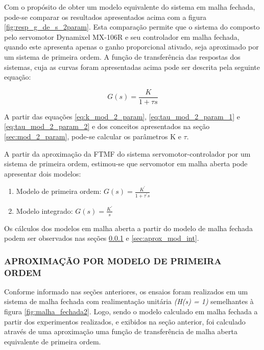 \documentclass[12pt,oneside,a4paper, chapter=TITLE, section = TITLE, english, brazil]{abntex2}
\begin{document}
Com o propósito de obter um modelo equivalente do sistema em malha fechada, pode-se comparar os resultados apresentados acima com a figura \ref{fig:resp_g_de_s_2param}. Esta comparação permite que o sistema do composto pelo servomotor Dynamixel MX-106R e seu controlador em malha fechada, quando este apresenta apenas o ganho proporcional ativado, seja aproximado por um sistema de primeira ordem. A função de transferência das respostas dos sistemas, cuja as curvas foram apresentadas acima pode ser descrita pela seguinte equação:

\begin{equation}
G(s) = \frac{K}{1 + \tau s} \label{eq:g_s_1_ordem_MF}
\end{equation}

A partir das equações \ref{eq:k_mod_2_param}, \ref{eq:tau_mod_2_param_1} e \ref{eq:tau_mod_2_param_2} e dos conceitos apresentados na seção \ref{sec:mod_2_param}, pode-se calcular os parâmetros K e $\tau$.

A partir da aproximação da FTMF do sistema servomotor-controlador por um sistema de primeira ordem, estimou-se que servomotor em malha aberta pode apresentar dois modelos:

\begin{enumerate}

\item Modelo de primeira ordem:
$G(s) = \frac{K^{'}}{1 + \tau^{'} s}$

\item Modelo integrado:
$G(s) = \frac{K^{'}}{s}$

\end{enumerate}

Os cálculos dos modelos em malha aberta a partir do modelo de malha fechada podem ser observados nas seções \ref{sec:aprox_mod_1_ord} e \ref{sec:aprox_mod_int}.

\subsubsection{APROXIMAÇÃO POR MODELO DE PRIMEIRA ORDEM} \label{sec:aprox_mod_1_ord} %

Conforme informado nas seções anteriores, os ensaios foram realizados em um sistema de malha fechada com realimentação unitária \textit{(H(s) = 1)} semelhantes à figura \ref{fig:malha_fechada2}. Logo, sendo o modelo calculado em malha fechada a partir dos experimentos realizados, e exibidos na seção anterior, foi calculado através de uma aproximação uma função de transferência de malha aberta equivalente de primeira ordem.
\end{document}
